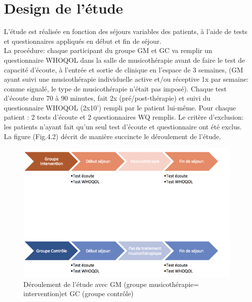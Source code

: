 \section{Design de l'étude}
L'étude est
réalisée en fonction des séjours variables des patients, à l'aide de tests et questionnaires appliqués en 
début
et fin de séjour.
\\
La procédure: chaque participant du groupe GM et GC va remplir un questionnaire  WHOQOL dans 
la salle de musicothérapie avant de  faire le 
test de capacité d'écoute, à l'entrée et sortie de
clinique en l'espace de 3 semaines, (GM ayant suivi une musicothérapie individuelle active et/ou 
réceptive 
1x par
semaine:  comme signalé, le type de musicothérapie n'était pas imposé).
Chaque test d'écoute dure
70 à 90 minutes, fait 2x (pré/post-thérapie) et
suivi du questionnaire WHOQOL (2x10') rempli par le
patient lui-même.
Pour chaque patient : 2 tests d'écoute et 2 
questionnaires WQ 
remplis. Le critère d'exclusion: les patients n'ayant fait qu'un seul test d'écoute et questionnaire  ont été 
exclus.
\\
La  figure (Fig.4.2) décrit de manière succincte le déroulement de
l'étude. 
\begin{figure}[hb]
	\centering
	\includegraphics[width=0.7\linewidth]{images/Groupecontrole.png}
	\caption[Schéma du déroulement]{Déroulement de l'étude avec GM (groupe musicothérapie=
		intervention)et GC 
		(groupe contrôle)}
	\end{figure}








